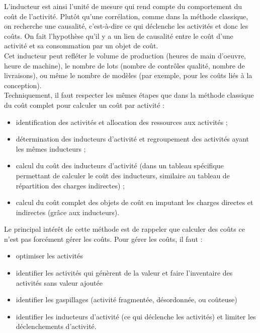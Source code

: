 \documentclass{tufte-handout}
\begin{document}
\begin{enumerate}
L'inducteur est ainsi l'unité de mesure qui rend compte du comportement du coût de l’activité. Plutôt qu'une corrélation, comme dans la méthode classique, on recherche une causalité, c'est-à-dire ce qui déclenche les activités et donc les coûts. On fait l'hypothèse qu'il y a un lien de causalité entre le coût d’une activité et sa consommation par un objet de coût.\\

Cet inducteur peut refléter le volume de production (heures de main d'oeuvre, heure de machine), le nombre de lots (nombre de contrôles qualité, nombre de livraisons), ou même le nombre de modèles (par exemple, pour les coûts liés à la conception).\\

Techniquement, il faut respecter les mêmes étapes que dans la méthode classique du coût complet pour calculer un coût par activité :\\
\begin{itemize}
\item identification des activités et allocation des ressources aux activités ;\\
\item détermination des inducteurs d’activité et regroupement des activités ayant les mêmes inducteurs ;\\
\item calcul du coût des inducteurs d’activité (dans un tableau spécifique permettant de calculer le coût des inducteurs, similaire au tableau de répartition des charges indirectes) ;\\
\item calcul du coût complet des objets de coût en imputant les charges directes et indirectes (grâce aux inducteurs).\\
\end{itemize}

Le principal intérêt de cette méthode est de rappeler que calculer des coûts ce n’est pas forcément gérer les coûts. Pour gérer les coûts, il faut :\\
\begin{itemize}
\item optimiser les activités\\
\item identifier les activités qui génèrent de la valeur et faire l’inventaire des activités sans valeur ajoutée\\
\item identifier les gaspillages (activité fragmentée, désordonnée, ou coûteuse)\\
\item identifier les inducteurs d’activité (ce qui déclenche les activités) et limiter les déclenchements d’activité.\\
\end{itemize}


\end{enumerate}
\end{document}
